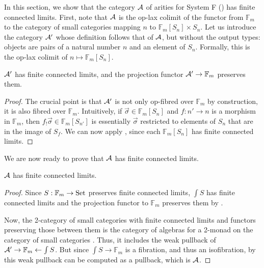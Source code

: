
\label{app:A-finite-F}In this section, we show that the category
${\cal A}$ of arities for System F () has finite
connected limits. First, note that ${\cal A}$ is the op-lax colimit
of the functor from $\mathbb{F}_{m}$ to the category of small categories
mapping $n$ to $\mathbb{F}_{m}[S_{n}]\times S_{n}$. Let us introduce
the category ${\cal A}'$ whose definition follows that of ${\cal A}$,
but without the output types: objects are pairs of a natural number
$n$ and an element of $S_{n}$. Formally, this is the op-lax colimit
of $n\mapsto\mathbb{F}_{m}[S_{n}]$.
\begin{lemma}
\label{lem:A'-lim}${\cal A}'$ has finite connected limits, and the
projection functor ${\cal A}'\rightarrow\mathbb{F}_{m}$ preserves
them.
\end{lemma}
\begin{proof}
The crucial point is that ${\cal A}'$ is not only op-fibred over
$\mathbb{F}_{m}$ by construction, it is also fibred over $\mathbb{F}_{m}$.
Intuitively, if $\vec{\sigma}\in\mathbb{F}_{m}[S_{n}]$ and $f:n'\rightarrow n$
is a morphism in $\mathbb{F}_{m}$, then $f_{!}\vec{\sigma}\in\mathbb{F}_{m}[S_{n'}]$
is essentially $\vec{\sigma}$ restricted to elements of $S_{n}$
that are in the image of $S_{f}$.  We can now apply \citet[Corollary 4.3]{grayfib},
since each $\mathbb{F}_{m}[S_{n}]$ has finite connected limits.
\end{proof}
We are now ready to prove that ${\cal A}$ has finite connected limits.
\begin{lemma}
${\cal A}$ has finite connected limits.
\end{lemma}
\begin{proof}
Since $S:\mathbb{F}_{m}\rightarrow\Set$ preserves finite connected
limits, $\int S$ has finite connected limits and the projection functor
to $\mathbb{F}_{m}$ preserves them by .

Now, the 2-category of small categories with finite connected limits
and functors preserving those between them is the category of algebras
for a 2-monad on the category of small categories \citet{BLACKWELL19891}.
Thus, it includes the weak pullback of ${\cal A}'\rightarrow\mathbb{F}_{m}\leftarrow\int S$.
But since $\int S\rightarrow\mathbb{F}_{m}$ is a fibration, and thus
an isofibration, by \citet{JoyalStreetPullbacks} this weak pullback
can be computed as a pullback, which is ${\cal A}$.
\end{proof}

